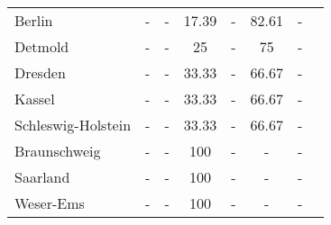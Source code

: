 \begin{table}[H]
\begin{tabularx}{\textwidth}{Xccccccc}
            Berlin & - & - & 17.39 & - & 82.61 & - \\
            Detmold & - & - & 25 & - & 75 & - \\
            Dresden & - & - & 33.33 & - & 66.67 & - \\
            Kassel & - & - & 33.33 & - & 66.67 & - \\
            Schleswig-Holstein & - & - & 33.33 & - & 66.67 & - \\
            Braunschweig & - & - & 100 & - & - & - \\
            Saarland & - & - & 100 & - & - & - \\
            Weser-Ems & - & - & 100 & - & - & - \\
        \bottomrule
    \end{tabularx}
\end{table}
    